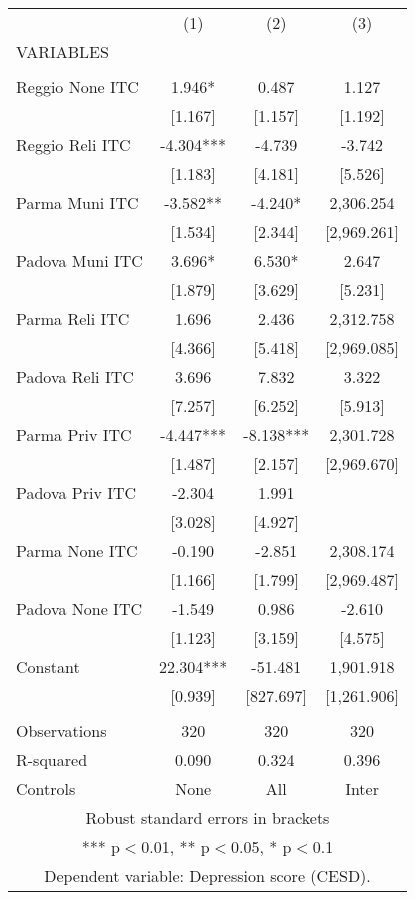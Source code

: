 \begin{tabular}{lccc} \hline
 & (1) & (2) & (3) \\
VARIABLES &  &  &  \\ \hline
 &  &  &  \\
Reggio None ITC & 1.946* & 0.487 & 1.127 \\
 & [1.167] & [1.157] & [1.192] \\
Reggio Reli ITC & -4.304*** & -4.739 & -3.742 \\
 & [1.183] & [4.181] & [5.526] \\
Parma Muni ITC & -3.582** & -4.240* & 2,306.254 \\
 & [1.534] & [2.344] & [2,969.261] \\
Padova Muni ITC & 3.696* & 6.530* & 2.647 \\
 & [1.879] & [3.629] & [5.231] \\
Parma Reli ITC & 1.696 & 2.436 & 2,312.758 \\
 & [4.366] & [5.418] & [2,969.085] \\
Padova Reli ITC & 3.696 & 7.832 & 3.322 \\
 & [7.257] & [6.252] & [5.913] \\
Parma Priv ITC & -4.447*** & -8.138*** & 2,301.728 \\
 & [1.487] & [2.157] & [2,969.670] \\
Padova Priv ITC & -2.304 & 1.991 &  \\
 & [3.028] & [4.927] &  \\
Parma None ITC & -0.190 & -2.851 & 2,308.174 \\
 & [1.166] & [1.799] & [2,969.487] \\
Padova None ITC & -1.549 & 0.986 & -2.610 \\
 & [1.123] & [3.159] & [4.575] \\
Constant & 22.304*** & -51.481 & 1,901.918 \\
 & [0.939] & [827.697] & [1,261.906] \\
 &  &  &  \\
Observations & 320 & 320 & 320 \\
R-squared & 0.090 & 0.324 & 0.396 \\
 Controls & None & All & Inter \\ \hline
\multicolumn{4}{c}{ Robust standard errors in brackets} \\
\multicolumn{4}{c}{ *** p$<$0.01, ** p$<$0.05, * p$<$0.1} \\
\multicolumn{4}{c}{ Dependent variable: Depression score (CESD).} \\
\end{tabular}
